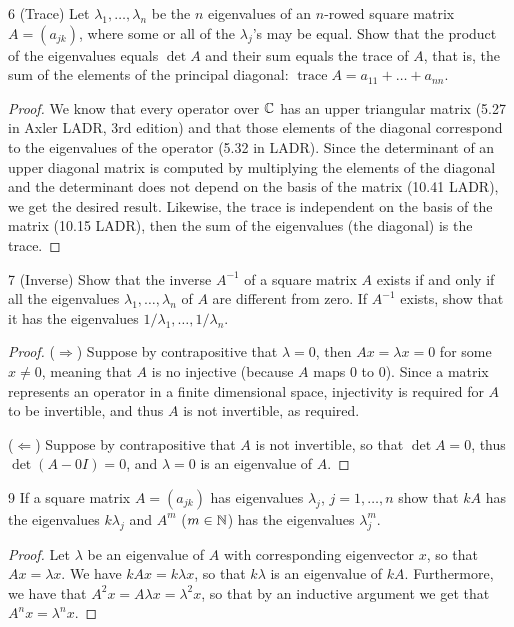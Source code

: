 \begin{exercise}{6 (Trace)}
Let $\lambda_1, \dots, \lambda_n$ be the $n$ eigenvalues of an $n$-rowed square matrix $A = (a_{jk})$, where some or all of the $\lambda_j$'s may be equal.
Show that the product of the eigenvalues equals $\det A$ and their sum equals the trace of $A$, that is, the sum of the elements of the principal diagonal: $\operatorname{trace} A = a_{11} + \dots + a_{nn}$.
\end{exercise}
\begin{proof}
We know that every operator over $\mathbb{C}$ has an upper triangular matrix (5.27 in Axler LADR, 3rd edition) and that those elements of the diagonal correspond to the eigenvalues of the operator (5.32 in LADR).
Since the determinant of an upper diagonal matrix is computed by multiplying the elements of the diagonal and the determinant does not depend on the basis of the matrix (10.41 LADR), we get the desired result.
Likewise, the trace is independent on the basis of the matrix (10.15 LADR), then the sum of the eigenvalues (the diagonal) is the trace.
\end{proof} 

\begin{exercise}{7 (Inverse)}
Show that the inverse $A^{-1}$ of a square matrix $A$ exists if and only if all the eigenvalues $\lambda_1, \dots, \lambda_n$ of $A$ are different from zero.
If $A^{-1}$ exists, show that it has the eigenvalues $1/\lambda_1, \dots, 1/\lambda_n$.
\end{exercise}
\begin{proof}
($\Rightarrow$)
Suppose by contrapositive that $\lambda = 0$, then $A x = \lambda x = 0$ for some $x \neq 0$, meaning that $A$ is no injective (because $A$ maps 0 to 0).
Since a matrix represents an operator in a finite dimensional space, injectivity is required for $A$ to be invertible, and thus $A$ is not invertible, as required.

($\Leftarrow$)
Suppose by contrapositive that $A$ is not invertible, so that $\det A = 0$, thus $\det(A - 0I) =0$, and $\lambda = 0$ is an eigenvalue of $A$.
\end{proof} 

\begin{exercise}{9}
If a square matrix $A = (a_{jk})$ has eigenvalues $\lambda_j$, $j = 1, \dots, n$ show that $kA$ has the eigenvalues $k \lambda_j$ and $A^m$ ($m \in \mathbb{N}$) has the eigenvalues $\lambda_j^m$.
\end{exercise}
\begin{proof}
Let $\lambda$ be an eigenvalue of $A$ with corresponding eigenvector $x$, so that $A x = \lambda x$.
We have $kA x = k\lambda x$, so that $k\lambda$ is an eigenvalue of $kA$.
Furthermore, we have that $A^2 x = A\lambda x = \lambda^2 x$, so that by an inductive argument we get that $A^n x = \lambda^n x$.
\end{proof} 

